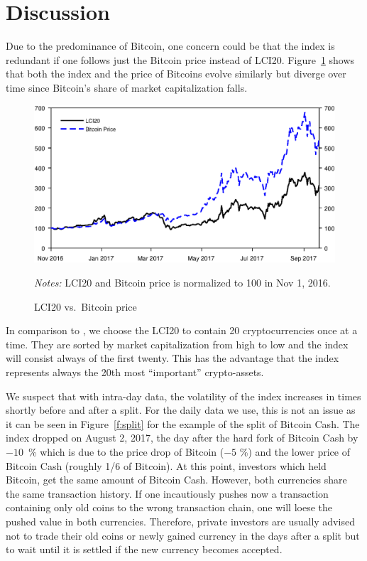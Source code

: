 \documentclass[11pt]{article}
\newcommand\fnotes[1]{\captionsetup{font=scriptsize}\caption*{\textsl{Notes:} #1}}
\begin{document}
\section{Discussion}

 Due to the predominance of Bitcoin, one concern could be that the index is redundant if one follows just the Bitcoin price instead of LCI20.
 Figure~\ref{f:lci20vsBTC} shows that both the index and the price of Bitcoins evolve similarly but diverge over time since Bitcoin's share of market capitalization falls.

 \begin{figure}[p]%
     \centering%
     \caption{LCI20 vs.\ Bitcoin price}\label{f:lci20vsBTC}%
     \includegraphics[width=\textwidth]{figs/lci20_vs_btc.eps}%
     \medskip\newline%
     \fnotes{LCI20 and Bitcoin price is normalized to 100 in Nov 1, 2016.}
 \end{figure}

In comparison to \cite{Trimborn2016}, we choose the LCI20 to contain 20 cryptocurrencies once at a time.
They are sorted by market capitalization from high to low and the index will consist always of the first twenty.
This has the advantage that the index represents always the 20th most ``important'' crypto-assets.

We suspect that with intra-day data, the volatility of the index increases in times shortly before and after a split.
For the daily data we use, this is not an issue as it can be seen in Figure~\ref{f:split} for the example of the split of Bitcoin Cash.
The index dropped on August 2, 2017, the day after the hard fork of Bitcoin Cash by $-10$~\% which is due to the price drop of Bitcoin ($-5$ \%) and the lower price of Bitcoin Cash (roughly 1/6 of Bitcoin).
At this point, investors which held Bitcoin, get the same amount of Bitcoin Cash.
However, both currencies share the same transaction history.
If one incautiously pushes now a transaction containing only old coins to the wrong transaction chain, one will loese the pushed value in both currencies.
Therefore, private investors are usually advised not to trade their old coins or newly gained currency in the days after a split but to wait until it is settled if the new currency becomes accepted.
\end{document}
